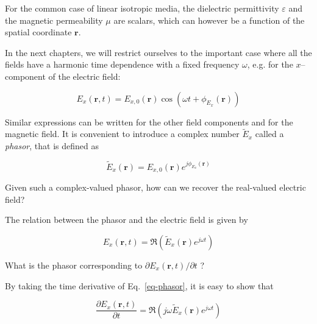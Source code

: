 For the common case of linear isotropic media, the dielectric permittivity $\varepsilon$ and the magnetic permeability $\mu$ are scalars, which can however be a function of the spatial coordinate ${\mathbf r}$.

In the next chapters, we will restrict ourselves to the important case where all the fields have a harmonic time dependence with a fixed frequency $\omega$, e.g. for the $x$--component of the electric field:

\begin{equation}
E_x({\mathbf r},t) = E_{x,0}({\mathbf r}) \cos \left( \omega t + \phi_{E_x} ({\mathbf r})
\right) \label{eq-phasor}
\end{equation}

Similar expressions can be written for the other field components and for the magnetic field. It is convenient to introduce a complex number $\tilde{E}_x$ called a \emph{phasor}, that is defined as

\begin{equation}
\tilde{E}_x(\mathbf{r})=E_{x,0}({\mathbf r}) e^{j \phi_{E_x}({\mathbf r})} \label{eq:phasor}
\end{equation}

\begin{cue}
Given such a complex-valued phasor, how can we recover the real-valued electric field?
\end{cue}

\noindent{}The relation between the phasor and the electric field is given by

\begin{equation}
E_x({\mathbf r},t) = \Re \left(\tilde{E}_x({\mathbf r}) e^{j \omega t}\right)
\end{equation}

\begin{cue}
What is the phasor corresponding to $\partial E_x({\mathbf r},t) / \partial t$ ?
\end{cue}

By taking the time derivative of Eq.~\ref{eq-phasor}, it is easy to show that 

\begin{equation}
\frac{\partial E_x({\mathbf r},t)}{\partial t} = \Re \left(j \omega \tilde{E}_x({\mathbf r}) e^{j \omega t}\right)
\end{equation}

